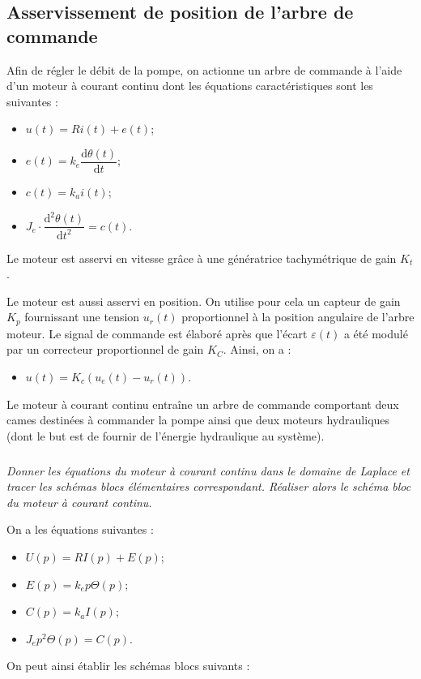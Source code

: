 \documentclass[10pt,fleqn]{article} %
\begin{document}
\begin{multicols}{2}
\subsection*{Asservissement de position de l'arbre de commande}
Afin de régler le débit de la pompe, on actionne un arbre de commande à l'aide d'un moteur à courant continu dont les équations caractéristiques sont les suivantes : 
\begin{itemize}
\item $u(t) = Ri(t)+e(t)$;
\item $e(t)=k_e \dfrac{\text{d}\theta(t)}{\text{d}t}$;
\item $c(t)=k_a i(t)$;
\item $J_e \cdot \dfrac{\text{d}^2\theta(t)}{\text{d}t^2} = c(t)$.
\end{itemize}

Le moteur est asservi en vitesse grâce à une génératrice tachymétrique de gain $K_t$.

Le moteur est aussi asservi en position. On utilise pour cela  un capteur de gain $K_p$ fournissant une tension $u_r(t)$ proportionnel à la position angulaire de l'arbre moteur. Le signal de commande est élaboré après que l'écart $\varepsilon(t)$ a été modulé par un correcteur proportionnel de gain $K_C$. Ainsi, on a :
\begin{itemize}
\item $u(t)=K_c \left(u_e(t)-u_r(t)\right)$.
\end{itemize}

Le moteur à courant continu entraîne un arbre de commande comportant deux cames destinées à commander la pompe ainsi que deux moteurs hydrauliques (dont le but est de fournir de l'énergie hydraulique au système). 


\subparagraph{}
\textit{Donner les équations du moteur à courant continu dans le domaine de Laplace et tracer les schémas blocs élémentaires correspondant. Réaliser alors le schéma bloc du moteur à courant continu.}
\ifprof
\begin{corrige}
On a les équations suivantes : 
\begin{itemize}
\item $U(p) = RI(p)+E(p)$;
\item $E(p)=k_e p\Theta(p)$;
\item $C(p)=k_a I(p)$;
\item $J_e p^2\Theta(p) = C(p)$.
\end{itemize}
On peut ainsi établir les schémas blocs suivants :



\end{corrige}
\end{multicols}
\end{document}
